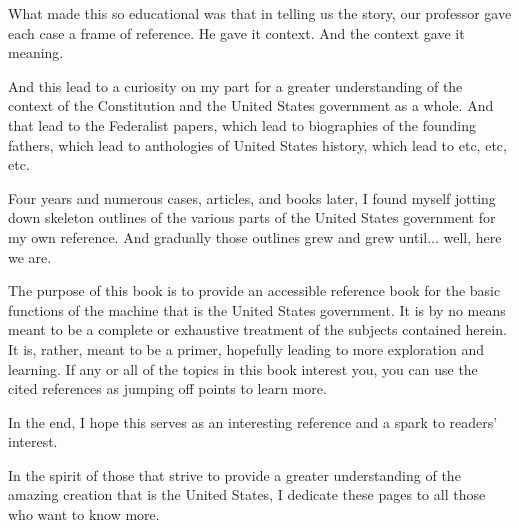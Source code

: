 What made this so educational was that in telling us the story, our professor gave each case a frame of reference.  He gave it context.  And the context gave it meaning.

And this lead to a curiosity on my part for a greater understanding of the context of the Constitution and the United States government as a whole.  And that lead to the Federalist papers, which lead to biographies of the founding fathers, which lead to anthologies of United States history, which lead to etc, etc, etc.

Four years and numerous cases, articles, and books later, I found myself jotting down skeleton outlines of the various parts of the United States government for my own reference.  And gradually those outlines grew and grew until... well, here we are.

The purpose of this book is to provide an accessible reference book for the basic functions of the machine that is the United States government.  It is by no means meant to be a complete or exhaustive treatment of the subjects contained herein.  It is, rather, meant to be a primer, hopefully leading to more exploration and learning.  If any or all of the topics in this book interest you, you can use the cited references as jumping off points to learn more.

In the end, I hope this serves as an interesting reference and a spark to readers' interest.

In the spirit of those that strive to provide a greater understanding of the amazing creation that is the United States, I dedicate these pages to all those who want to know more.
